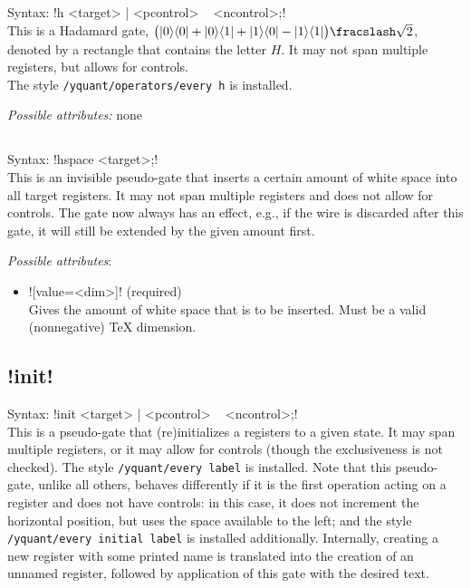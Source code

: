 \documentclass{scrartcl}
\def\ttlink{\link\texttt}
\def\ketbra#1#2{\ket{#1}\!\bra{#2}}
\begin{document}
      \subsection{\texorpdfstring{}{h}}
         Syntax: \yquant!h <target> | <pcontrol> ~ <ncontrol>;! \\
         This is a Hadamard gate, $\bigl( \ketbra00 + \ketbra01 + \ketbra10 - \ketbra11 \bigr) \fracslash \sqrt2$, denoted by a rectangle that contains the letter $H$.
         It may not span multiple registers, but allows for controls. \\
         The style \ttlink{/yquant/operators/every h} is installed.

         \emph{Possible attributes:} none

      \subsection{\texorpdfstring{}{hspace}}
         Syntax: \yquant!hspace <target>;! \\
         This is an invisible pseudo\hyp gate that inserts a certain amount of white space into all target registers.
         It may not span multiple registers and does not allow for controls.
         The gate now always has an effect, e.g., if the wire is discarded after this gate, it will still be extended by the given amount first.

         \emph{Possible attributes}:
         \begin{itemize}
            \item \yquant![value=<dim>]! (required) \\
               Gives the amount of white space that is to be inserted. Must be a valid (nonnegative) \TeX{} dimension.
         \end{itemize}

      \subsection[\texorpdfstring{\yquant{init}}{init}]{\yquant!init!}
         Syntax: \yquant!init <target> | <pcontrol> ~ <ncontrol>;! \\
         This is a pseudo\hyp gate that (re)initializes a registers to a given state.
         It may span multiple registers, or it may allow for controls (though the exclusiveness is not checked).
         The style \ttlink{/yquant/every label} is installed.
         Note that this pseudo\hyp gate, unlike all others, behaves differently if it is the first operation acting on a register and does not have controls: in this case, it does not increment the horizontal position, but uses the space available to the left; and the style \ttlink{/yquant/every initial label} is installed additionally.
         Internally, creating a new register with some printed name is translated into the creation of an unnamed register, followed by application of this gate with the desired text.
\end{document}
